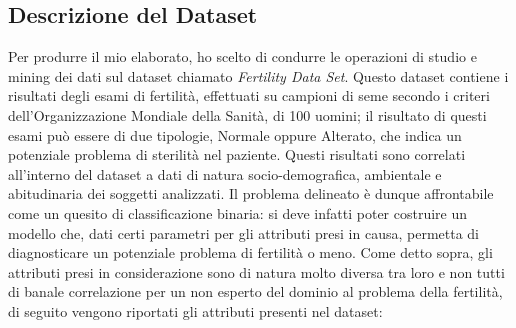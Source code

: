   \subsection{Descrizione del Dataset}
  Per produrre il mio elaborato, ho scelto di condurre le operazioni di studio e mining dei dati sul dataset chiamato \textit{Fertility Data Set}.
  Questo dataset contiene i risultati degli esami di fertilità, effettuati su campioni di seme secondo i criteri dell'Organizzazione Mondiale della Sanità, di 100 uomini; il risultato di questi esami può essere di due tipologie, Normale oppure Alterato, che indica un potenziale problema di sterilità nel paziente. Questi risultati sono correlati all'interno del dataset a dati di natura socio-demografica, ambientale e abitudinaria dei soggetti analizzati. 
  Il problema delineato è dunque affrontabile come un quesito di  classificazione binaria: si deve infatti poter costruire un modello che, dati certi parametri per gli attributi presi in causa, permetta di diagnosticare un potenziale problema di fertilità o meno.
  Come detto sopra, gli attributi presi in considerazione sono di natura molto diversa tra loro e non tutti di banale correlazione per un non esperto del dominio al problema della fertilità, di seguito vengono riportati gli attributi presenti nel dataset:

